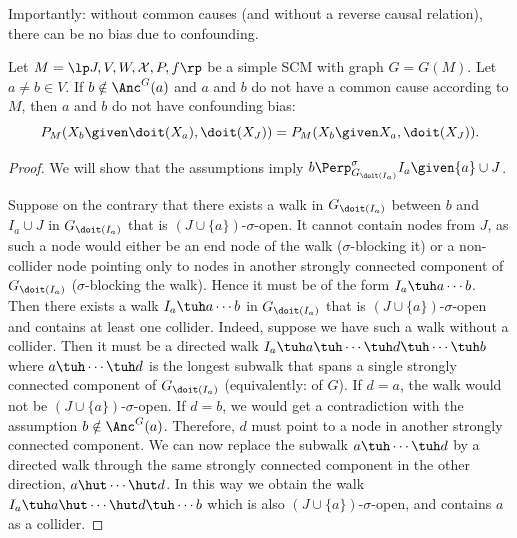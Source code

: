 Importantly: without common causes (and without a reverse causal relation), there can be no bias due to confounding.
\begin{Prp}\label{prp:scm_confounded_separation}
Let $M = \lt \Sin, \Send, \Srnd, \CX, P, f \rt$ be a simple SCM with graph $G = G(M)$.
Let $a \ne b \in V$.
If $b \notin \Anc^G(a)$ and $a$ and $b$ do not have a common cause according to $M$, then
$a$ and $b$ do not have confounding bias:
  $$P_{M}(X_b \given \doit(X_a), \doit(X_J)) = P_{M}(X_b \given X_a, \doit(X_J)).$$
\end{Prp}
\begin{proof}
We will show that the assumptions imply $b \Perp^\sigma_{G_{\doit(I_a)}} I_a \given \{a\} \cup J$.

Suppose on the contrary that there exists a walk in $G_{\doit(I_a)}$ between $b$ and $I_a \cup J$ in $G_{\doit(I_a)}$ that is 
$(J \cup \{a\})$-$\sigma$-open. 
It cannot contain nodes from $J$, as such a node would either be an end node of the walk ($\sigma$-blocking it)
or a non-collider node pointing only to nodes in another strongly connected component of $G_{\doit(I_a)}$
($\sigma$-blocking the walk).
Hence it must be of the form $I_a \tuh a \cdots b$. 
Then there exists a walk $I_a \tuh a \cdots b$ in $G_{\doit(I_a)}$ that is $(J \cup \{a\})$-$\sigma$-open and contains at least one collider. 
Indeed, suppose we have such a walk without a collider. Then it must be a directed walk
$I_a \tuh a \tuh \cdots \tuh d \tuh \cdots \tuh b$ where $a \tuh \cdots \tuh d$ is the longest subwalk that spans
a single strongly connected component of $G_{\doit(I_a)}$ (equivalently: of $G$). 
If $d = a$, the walk would not be $(J \cup \{a\})$-$\sigma$-open.
If $d = b$, we would get a contradiction with the assumption $b \notin \Anc^G(a)$. 
Therefore, $d$ must point to a node in another strongly connected component.
We can now replace the subwalk $a \tuh \cdots \tuh d$ by
a directed walk through the same strongly connected component in the other direction, $a \hut \cdots \hut d$.
In this way we obtain the walk
$I_a \tuh a \hut \cdots \hut d \tuh \cdots b$ which is also $(J \cup \{a\})$-$\sigma$-open, and contains $a$ as a collider.


\end{proof}
